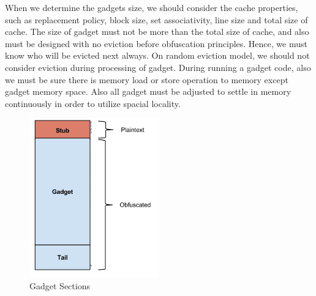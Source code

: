 	    When we determine the gadgets size, we should consider the cache properties, such as replacement policy, block size, set associativity, line size and total size of cache. The size of gadget must not be more than the total size of cache, and also must be designed with no eviction before obfuscation principles. Hence, we must know who will be evicted next always. On random eviction model, we should not consider eviction during processing of gadget. During running a gadget code, also we must be sure there is memory load or store operation to memory except gadget memory space. Also all gadget must be adjusted to settle in memory continuously in order to utilize spacial locality.

	    \begin{figure}[h!]
	        \centering
	        \includegraphics[width=0.5\textwidth]{img/Code_illustration.png}
	        \caption{Gadget Sections}
	        \label{fig:gadgetsections}
	    \end{figure}


